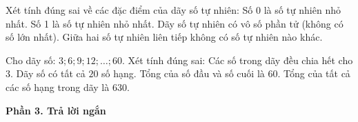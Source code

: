 \begin{ex} %
Xét tính đúng sai về các đặc điểm của dãy số tự nhiên:
\choiceTF
{\True Số 0 là số tự nhiên nhỏ nhất.}
{Số 1 là số tự nhiên nhỏ nhất.}
{\True Dãy số tự nhiên có vô số phần tử (không có số lớn nhất).}
{\True Giữa hai số tự nhiên liên tiếp không có số tự nhiên nào khác.}
\end{ex}

\begin{ex} %
Cho dãy số: $3; 6; 9; 12; \dots; 60$. Xét tính đúng sai:
\choiceTF
{\True Các số trong dãy đều chia hết cho 3.}
{\True Dãy số có tất cả $20$ số hạng.}
{Tổng của số đầu và số cuối là $60$.}
{\True Tổng của tất cả các số hạng trong dãy là $630$.}
\end{ex}

\textbf{Phần 3. Trả lời ngắn}

